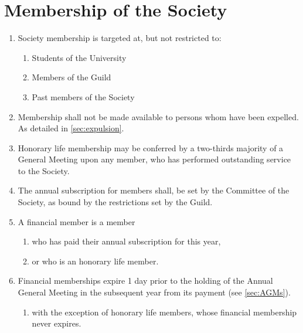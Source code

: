 \documentclass[a4paper]{article}
\begin{document}
\section{Membership of the Society}
\begin{enumerate}
    \item Society membership is targeted at, but not restricted to:
    \begin{enumerate}
        \item Students of the University
        \item Members of the Guild
        \item Past members of the Society
    \end{enumerate}
    \item Membership shall not be made available to persons whom have been expelled. As detailed in \cref{sec:expulsion}.
    \item Honorary life membership may be conferred by a two-thirds majority of a General Meeting upon any member, who has performed outstanding service to the Society.
    \item The annual subscription for members shall, be set by the Committee of the Society, as bound by the restrictions set by the Guild.
    \item A financial member is a member
    \begin{enumerate}
        \item who has paid their annual subscription for this year,
        \item or who is an honorary life member.
    \end{enumerate}
    \item Financial memberships expire 1 day prior to the holding of the Annual General Meeting in the subsequent year from its payment (see \cref{sec:AGMs}).
    \begin{enumerate}
    	\item with the exception of honorary life members, whose financial membership never expires.
    \end{enumerate}
\end{enumerate}
\end{document}
